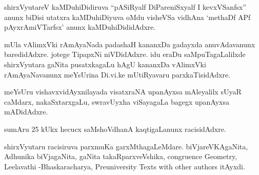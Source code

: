 shirxVyutareV kaMDuhiDidiruva ``pASiRyalf DiPareniSxyalf I kevxVSanfsx'' anunx biDisi utatxra kaMDuhiDiyuva oMdu visheVSa vidhAna `methaDf APf pAyxrAmiVTarfsx' anunx kaMDuhiDididAdxre.

mUla vAlimxVki rAmAyaNada padashaH kananxDa gadayxda anuvAdavanunx baredidAdxre. jotege TipapxNi niVDidAdxre. idu eraDu saMpuTagaLalilxde shirxVyutara gaNita pusatxka\-gaLu hAgU kananxDa vAlimxVki rAmAyaNavanunx meYsUrina Di.vi.ke mUtiRyavaru parxkaTisidAdxre.

meYsUru vishavxvidAyxnilayada visatxraNA upanAyxsa mAleyalilx sUyaR caMdarx, nakaSxtarxgaLu, swravUyxha viSayagaLa bagegx upanAyxsa mADidAdxre.

sumAru {\rm 25} kUkx hecucx saMshoVdhanA kaqtigaLanunx racisidAdxre.

shirxVyutaru racisiruva parxmuKa garxMthagaLeMdare. biVjareVKAgaNita, Adhunika biVja\-gaNita, gaNita takaRparxveVshika, {\rm congruence Geometry, Leelavathi -\break Bhaskaracharya, Preuniversity Texts with other authors} itAyxdi.
